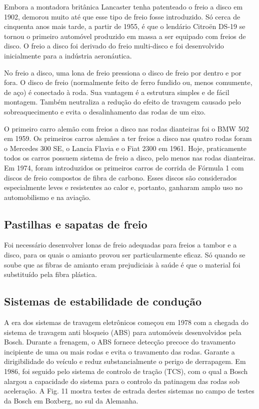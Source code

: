 Embora a montadora britânica Lancaster tenha patenteado o freio a disco em 1902, demorou muito até que esse tipo de freio fosse introduzido. Só cerca de cinquenta anos mais tarde, a partir de 1955, é que o lendário Citroën DS-19 se tornou o primeiro automóvel produzido em massa a ser equipado com freios de disco. O freio a disco foi derivado do freio multi-disco e foi desenvolvido inicialmente para a indústria aeronáutica. 

No freio a disco, uma lona de freio pressiona o disco de freio por dentro e por fora. O disco de freio (normalmente feito de ferro fundido ou, menos comumente, de aço) é conectado à roda. Sua vantagem é a estrutura simples e de fácil montagem. Também neutraliza a redução do efeito de travagem causado pelo sobreaquecimento e evita o desalinhamento das rodas de um eixo. 

O primeiro carro alemão com freios a disco nas rodas dianteiras foi o BMW 502 em 1959. Os primeiros carros alemães a ter freios a disco nas quatro rodas foram o Mercedes 300 SE, o Lancia Flavia e o Fiat 2300 em 1961. Hoje, praticamente todos os carros possuem sistema de freio a disco, pelo menos nas rodas dianteiras. Em 1974, foram introduzidos os primeiros carros de corrida de Fórmula 1 com discos de freio compostos de fibra de carbono. Esses discos são considerados especialmente leves e resistentes ao calor e, portanto, ganharam amplo uso no automobilismo e na aviação.

\subsection{Pastilhas e sapatas de freio} 

Foi necessário desenvolver lonas de freio adequadas para freios a tambor e a disco, para os quais o amianto provou ser particularmente eficaz. Só quando se soube que as fibras de amianto eram prejudiciais à saúde é que o material foi substituído pela fibra plástica.

\subsection{Sistemas de estabilidade de condução }

A era dos sistemas de travagem eletrônicos começou em 1978 com a chegada do sistema de travagem anti bloqueio (ABS) para automóveis desenvolvidos pela Bosch. Durante a frenagem, o ABS fornece detecção precoce do travamento incipiente de uma ou mais rodas e evita o travamento das rodas. Garante a dirigibilidade do veículo e reduz substancialmente o perigo de derrapagem. Em 1986, foi seguido pelo sistema de controlo de tração (TCS), com o qual a Bosch alargou a capacidade do sistema para o controlo da patinagem das rodas sob aceleração. A Fig. 11 mostra testes de estrada destes sistemas no campo de testes da Bosch em Boxberg, no sul da Alemanha.


